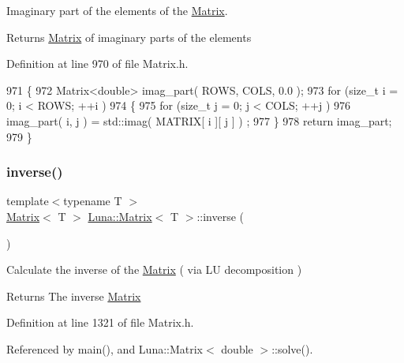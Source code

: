 Imaginary part of the elements of the \hyperlink{classLuna_1_1Matrix}{Matrix}. 

\begin{DoxyReturn}{Returns}
\hyperlink{classLuna_1_1Matrix}{Matrix} of imaginary parts of the elements 
\end{DoxyReturn}


Definition at line 970 of file Matrix.\+h.


\begin{DoxyCode}
971   \{
972     Matrix<double> imag\_part( ROWS, COLS, 0.0 );
973     \textcolor{keywordflow}{for} (\textcolor{keywordtype}{size\_t} i = 0; i < ROWS; ++i )
974     \{
975       \textcolor{keywordflow}{for} (\textcolor{keywordtype}{size\_t} j = 0; j < COLS; ++j )
976       imag\_part( i, j ) = std::imag( MATRIX[ i ][ j ] ) ;
977     \}
978     \textcolor{keywordflow}{return} imag\_part;
979   \}
\end{DoxyCode}
\mbox{\label{classLuna_1_1Matrix_a3962ed8b7e17a10ecbcaed0e0320a992}} 
\subsubsection{\texorpdfstring{inverse()}{inverse()}}
{\footnotesize\ttfamily template$<$typename T $>$ \\
\hyperlink{classLuna_1_1Matrix}{Matrix}$<$ T $>$ \hyperlink{classLuna_1_1Matrix}{Luna\+::\+Matrix}$<$ T $>$\+::inverse (\begin{DoxyParamCaption}{ }\end{DoxyParamCaption})\hspace{0.3cm}{\ttfamily [inline]}}



Calculate the inverse of the \hyperlink{classLuna_1_1Matrix}{Matrix} ( via LU decomposition ) 

\begin{DoxyReturn}{Returns}
The inverse \hyperlink{classLuna_1_1Matrix}{Matrix} 
\end{DoxyReturn}


Definition at line 1321 of file Matrix.\+h.



Referenced by main(), and Luna\+::\+Matrix$<$ double $>$\+::solve().


